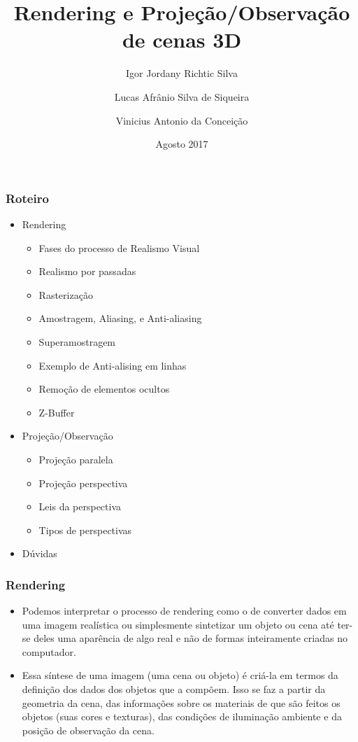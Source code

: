 \documentclass{beamer}
\title{Rendering e Projeção/Observação de cenas 3D}
\author[Igor, Lucas, Vinicius]
{
	Igor Jordany Richtic Silva\inst{1} 
	\and Lucas Afrânio Silva de Siqueira\inst{1} 
	\and Vinicius Antonio da Conceição\inst{1}
}
\institute[IC]
{
	\inst{1} Instituto de Computação\\ Universidade Federal de Mato Grosso
}
\date[2017]
{
	Agosto 2017
}
\begin{document}
	\begin{frame}
		\maketitle
	\end{frame}
	\begin{frame}
		\frametitle{Roteiro}
		\begin{itemize}
		\item Rendering
		\begin{itemize}
			\item Fases do processo de Realismo Visual
			\item Realismo por passadas
			\item Rasterização
			\item Amostragem, Aliasing, e Anti-aliasing
			\item Superamostragem
			\item Exemplo de Anti-alising em linhas
			\item Remoção de elementos ocultos
			\item Z-Buffer
		\end{itemize}
		\item Projeção/Observação
		\begin{itemize}
			\item Projeção paralela
			\item Projeção perspectiva
			\item Leis da perspectiva
			\item Tipos de perspectivas
		\end{itemize}
		\item Dúvidas
		\end{itemize}
	\end{frame}
	\begin{frame}
		\frametitle{Rendering}
		\begin{itemize}
		\item Podemos interpretar o processo de rendering como o de converter dados em uma imagem realística ou simplesmente sintetizar um objeto ou cena até ter-se deles uma aparência de algo real e não de formas inteiramente criadas no computador.\\
		\item Essa síntese de uma imagem (uma cena ou objeto) é criá-la em termos da definição dos dados dos objetos que a compõem. Isso se faz a partir da geometria da cena, das informações sobre os materiais de que são feitos os objetos (suas cores e texturas), das condições de iluminação ambiente e da posição de observação da cena.
		\end{itemize}
	\end{frame}
\end{document}

